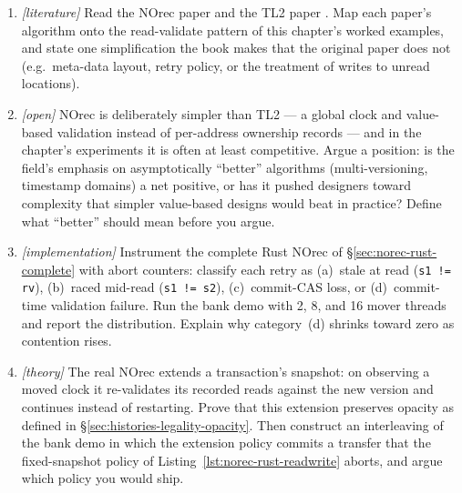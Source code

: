\begin{enumerate}
    \item \emph{[literature]} Read the NOrec paper \cite{dalessandro10norec}
          and the TL2 paper \cite{dice06tl2}.  Map each paper's algorithm
          onto the read-validate pattern of this chapter's worked examples,
          and state one simplification the book makes that the original
          paper does not (e.g.\ meta-data layout, retry policy, or the
          treatment of writes to unread locations).
    \item \emph{[open]} NOrec is deliberately simpler than TL2 --- a global
          clock and value-based validation instead of per-address ownership
          records --- and in the chapter's experiments it is often at least
          competitive.  Argue a position: is the field's emphasis on
          asymptotically ``better'' algorithms (multi-versioning, timestamp
          domains) a net positive, or has it pushed designers toward
          complexity that simpler value-based designs would beat in
          practice?  Define what ``better'' should mean before you argue.
    \item \emph{[implementation]} Instrument the complete Rust NOrec of
          \S\ref{sec:norec-rust-complete} with abort counters: classify
          each retry as (a)~stale at read (\texttt{s1 != rv}), (b)~raced
          mid-read (\texttt{s1 != s2}), (c)~commit-CAS loss, or
          (d)~commit-time validation failure.  Run the bank demo with 2,
          8, and 16 mover threads and report the distribution.  Explain
          why category~(d) shrinks toward zero as contention rises.
    \item \emph{[theory]} The real NOrec extends a transaction's snapshot:
          on observing a moved clock it re-validates its recorded reads
          against the new version and continues instead of restarting.
          Prove that this extension preserves opacity as defined in
          \S\ref{sec:histories-legality-opacity}.  Then construct an
          interleaving of the bank demo in which the extension policy
          commits a transfer that the fixed-snapshot policy of
          Listing~\ref{lst:norec-rust-readwrite} aborts, and argue which
          policy you would ship.
\end{enumerate}

